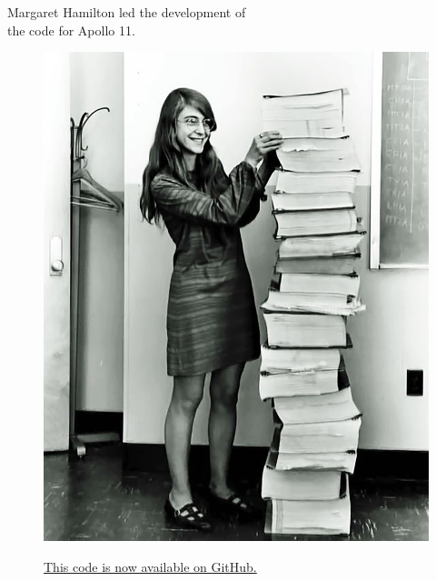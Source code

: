 \documentclass[xcolor={dvipsnames}]{beamer}
\begin{document}
\begin{frame}{Margaret Hamilton led the development of\\ the code for Apollo 11.}{}
\begin{figure}
\centering
\includegraphics[height=0.7\textheight]{Apollo}
\label{fig:Apollo}
\caption*{\href{https://github.com/chrislgarry/Apollo-11}{This code is now available on GitHub.}}
\end{figure}
\end{frame}
\end{document}
